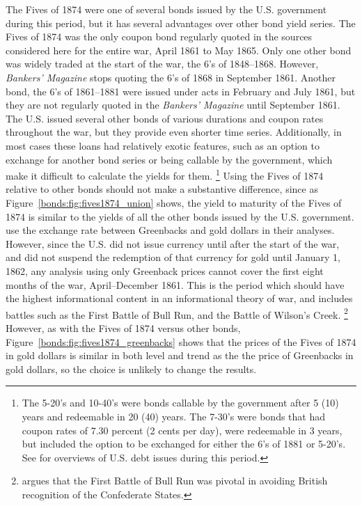 The Fives of 1874 were one of several bonds issued by the U.S. government during this period, but it has several advantages over other bond yield series.
The Fives of 1874 was the only coupon bond regularly quoted in the sources considered here for the entire war, April 1861 to May 1865.
Only one other bond was widely traded at the start of the war, the 6's of 1848--1868.
However, \textit{Bankers' Magazine} stops quoting the 6's of 1868 in September 1861.
Another bond, the  6's of 1861--1881 were issued under acts in February and July 1861, but they are not regularly quoted in the \textit{Bankers' Magazine} until September 1861.
The U.S. issued several other bonds of various durations and coupon rates throughout the war, but they provide even shorter time series.
Additionally, in most cases these loans had relatively exotic features, such as an option to exchange for another bond series or being callable by the government, which make it difficult to calculate the yields for them.
\footnote{
  The 5-20's and 10-40's were bonds callable by the government after 5 (10) years and redeemable in 20 (40) years.
  The 7-30's were bonds that had coupon rates of 7.30 percent (2 cents per day), were redeemable in 3 years, but included the option to be exchanged for either the 6's of 1881 or 5-20's.
  See \textcites{Bayley1882}{DeKnight1900}[297--309]{HomerSylla2005} for overviews of U.S. debt issues during this period.
}
Using the Fives of 1874 relative to other bonds should not make a substantive difference, since as Figure~\ref{bonds:fig:fives1874_union} shows, the yield to maturity of the Fives of 1874 is similar to the yields of all the other bonds issued by the U.S. government.
\textcites{WillardGuinnaneEtAl1996}{McCandless1996}{SmithSmith1997} use the exchange rate between Greenbacks and gold dollars in their analyses.
However, since the U.S. did not issue currency until after the start of the war, and did not suspend the redemption of that currency for gold until January 1, 1862, any analysis using only Greenback prices cannot cover the first eight months of the war, April--December 1861.
This is the period which should have the highest informational content in an informational theory of war, and includes battles such as the First Battle of Bull Run, and the Battle of Wilson's Creek.%
\footnote{\textcite{Poast2012} argues that the First Battle of Bull Run was pivotal in avoiding British recognition of the Confederate States.}
However, as with the Fives of 1874 versus other bonds,  Figure~\ref{bonds:fig:fives1874_greenbacks} shows that the prices of the Fives of 1874 in gold dollars is similar in both level and trend as the the price of Greenbacks in gold dollars, so the choice is unlikely to change the results.

